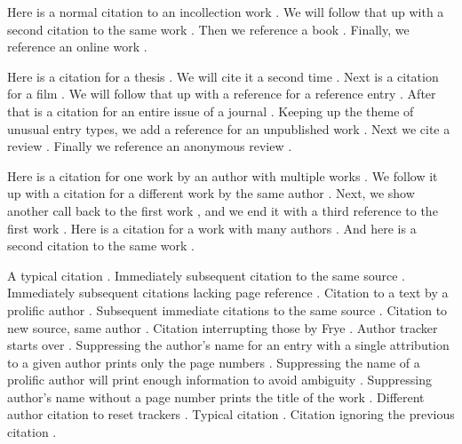 \documentclass{article}
\begin{document}
Here is a normal citation to an incollection work \autocite[7]{haggis99aa}. We will follow that up with a second citation to the same work \autocite[8]{haggis99aa}. Then we reference a book \autocite[194]{public08aa}. Finally, we reference an online work \autocite{Grammar-Girl2008}.

Here is a citation for a thesis \autocite[22]{webb84aa}. We will cite it a second time \autocite[23]{webb84aa}. Next is a citation for a film \autocite{jhabvala85aa}. We will follow that up with a reference for a reference entry \autocite{reference-noon89aa}. After that is a citation for an entire issue of a journal \autocite{appiah92aa}. Keeping up the theme of unusual entry types, we add a reference for an unpublished work \autocite{salviatiXXaa}. Next we cite a review \autocite[224]{slater01aa}. Finally we reference an anonymous review \autocite[785]{danish1972aa}.

Here is a citation for one work by an author with multiple works \autocite[12]{askme06aa}. We follow it up with a citation for a different work by the same author \autocite[34]{askme92aa}. Next, we show another call back to the first work \autocite[45]{askme06aa}, and we end it with a third reference to the first work \autocite[56]{askme06aa}. Here is a citation for a work with many authors \autocite[34]{Babich:2011dg}. And here is a second citation to the same work \autocite[32]{Babich:2011dg}.

A typical citation \autocite[12]{morrison02aa}. Immediately subsequent citation to the same source \autocite[34]{morrison02aa}. Immediately subsequent citations lacking page reference \autocite{morrison02aa}. Citation to a text by a prolific author \autocite[12]{frye57ab}. Subsequent immediate citations to the same source \autocite[34]{frye57ab}. Citation to new source, same author \autocite[56]{frye91aa}. Citation interrupting those by Frye \autocite[101]{morrison02aa}. Author tracker starts over \autocite[78]{frye91aa}. Suppressing the author's name for an entry with a single attribution to a given author prints only the page numbers \autocite*[102]{morrison02aa}. Suppressing the name of a prolific author will print enough information to avoid ambiguity \autocite*[91]{frye57ab}. Suppressing author's name without a page number prints the title of the work \autocite*{morrison02aa}. Different author citation to reset trackers \autocite[91]{frye91aa}. Typical citation \autocite[12]{morrison02aa}. Citation ignoring the previous citation \mancite\autocite[34]{morrison02aa}.

\printbibliography
\end{document}
